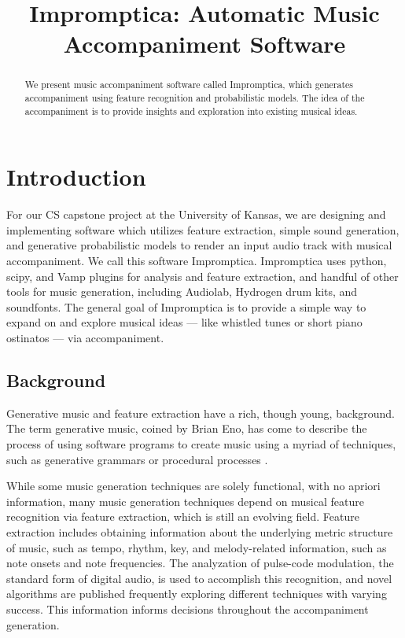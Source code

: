 \documentclass[11pt,conference,letterpaper]{IEEEtran}
\begin{document}
\title{Impromptica: Automatic Music Accompaniment Software}
\author{}

\maketitle

\begin{abstract}
We present music accompaniment software called Impromptica, which generates accompaniment using feature recognition and probabilistic models. The idea of the accompaniment is to provide insights and exploration into existing musical ideas.
\end{abstract}

\section{Introduction}

For our CS capstone project at the University of Kansas, we are designing and implementing software which utilizes feature extraction, simple sound generation, and generative probabilistic models to render an input audio track with musical accompaniment. We call this software Impromptica. Impromptica uses python, scipy, and Vamp plugins for analysis and feature extraction, and handful of other tools for music generation, including Audiolab, Hydrogen drum kits, and soundfonts. The general goal of Impromptica is to provide a simple way to expand on and explore musical ideas --- like whistled tunes or short piano ostinatos --- via accompaniment.

\subsection{Background}

Generative music and feature extraction have a rich, though young, background. The term generative music, coined by Brian Eno, has come to describe the process of using software programs to create music using a myriad of techniques, such as generative grammars or procedural processes \cite{wooller2005framework}.

While some music generation techniques are solely functional, with no apriori information, many music generation techniques depend on musical feature recognition via feature extraction, which is still an evolving field. Feature extraction includes obtaining information about the underlying metric structure of music, such as tempo, rhythm, key, and melody-related information, such as note onsets and note frequencies. The analyzation of pulse-code modulation, the standard form of digital audio, is used to accomplish this recognition, and novel algorithms are published frequently exploring different techniques with varying success. This information informs decisions throughout the accompaniment generation. 
\end{document}
